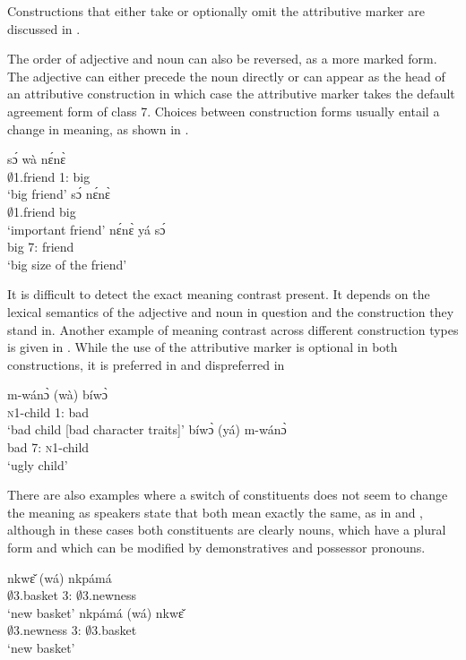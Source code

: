 \noindent Constructions that either take or optionally omit the attributive marker are discussed in .

The order of adjective and noun can also be reversed, as a  more marked form. The adjective can either precede the noun directly or can appear as the head of an attributive construction in which case the attributive marker takes the default agreement form of class 7. Choices between construction forms
usually entail a change in meaning, as shown in .

\ea \label{qualif1}
  \ea \label{qualif1a}
 \gll  sɔ́ wà nɛ́nɛ̀  \\
          $\emptyset$1.friend 1:{\ATT} big  \\
    \trans `big friend'
\ex \label{qualif1b}
  \gll   sɔ́ nɛ́nɛ̀\\
          $\emptyset$1.friend big \\
    \trans `important friend'
\ex \label{qualif1c}
  \gll    nɛ́nɛ̀ yá sɔ́ \\
          big 7:{\ATT} friend \\
    \trans `big size of the friend'
\z
\z

It is difficult to detect the exact meaning contrast present. It depends on the lexical semantics of the adjective and noun in question and the construction they stand in. Another example of meaning contrast across different construction types is given in . While the use of the attributive marker is optional in both constructions, it is preferred in  and dispreferred in 

\ea \label{qualif2}
  \ea \label{qualif2a}
 \gll  m-wánɔ̀ (wà) bíwɔ̀  \\
          \textsc{n}1-child 1:{\ATT} bad  \\
    \trans `bad child [bad character traits]'
\ex \label{qualif2b}
  \gll   bíwɔ̀ (yá) m-wánɔ̀\\
          bad 7:{\ATT} \textsc{n}1-child \\
    \trans `ugly child'
\z
\z

There are also examples where a switch of constituents does not seem to change the meaning as speakers state that both mean exactly the same, as in  and , although in these cases both constituents are clearly nouns, which have a plural form and which can be modified by demonstratives and possessor pronouns.

\ea \label{qualif3}
  \ea \label{qualif3a}
 \gll  nkwɛ̌ (wá) nkpámá  \\
          $\emptyset$3.basket 3:{\ATT} $\emptyset$3.newness  \\
    \trans `new basket'
\ex \label{qualif3b}
  \gll   nkpámá (wá) nkwɛ̌\\
          $\emptyset$3.newness 3:{\ATT} $\emptyset$3.basket \\
    \trans `new basket'
\z
\z

